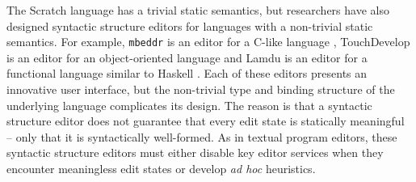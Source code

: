 The Scratch language has a trivial static semantics, but researchers have also designed syntactic structure editors for  languages with a non-trivial static semantics. For example, \texttt{mbeddr} is an editor for a C-like language \cite{voelter_mbeddr:_2012}, TouchDevelop is an editor for an object-oriented language \cite{tillmann_touchdevelop:_2011} and Lamdu is an editor for a functional language similar to Haskell \cite{lamdu}. Each of these editors presents an innovative user interface, but the non-trivial type and binding structure of the underlying language complicates its design. The reason is that a syntactic structure editor does not guarantee that every edit state is statically meaningful -- only that it is syntactically well-formed. As in textual program editors, these syntactic structure editors must either disable key editor services when they encounter meaningless edit states or develop \emph{ad hoc} heuristics.




